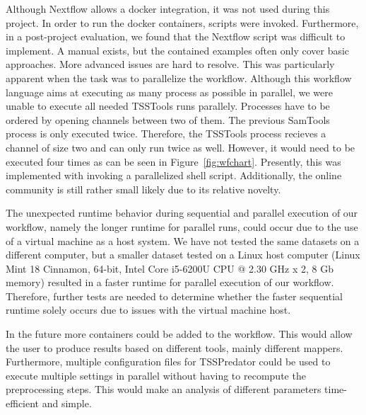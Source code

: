 \documentclass[twoside]{article}
\begin{document}
Although Nextflow allows a docker integration, it was not used during this project. In order to run the docker containers, scripts were invoked. Furthermore, in a post-project evaluation, we found that the Nextflow script was difficult to implement. A manual exists, but the contained examples often only cover basic approaches. More advanced issues are hard to resolve. This was particularly apparent when the task was to parallelize the workflow. Although this workflow language aims at executing as many process as possible in parallel, we were unable to execute all needed TSSTools runs parallely. Processes have to be ordered by opening channels between two of them. The previous SamTools process is only executed twice. Therefore, the TSSTools process recieves a channel of size two and can only run twice as well. However, it would need to be executed four times as can be seen in Figure~\ref{fig:wfchart}. Presently, this was implemented with invoking a parallelized shell script. Additionally, the online community is still rather small likely due to its relative  novelty.

The unexpected runtime behavior during sequential and parallel execution of our workflow, namely the longer runtime for parallel runs, could occur due to the use of a virtual machine as a host system. We have not tested the same datasets on a different computer, but a smaller dataset tested on a Linux host computer (Linux Mint 18 Cinnamon, 64-bit, Intel Core i5-6200U CPU @ 2.30 GHz x 2, 8 Gb memory) resulted in a faster runtime for parallel execution of our workflow. Therefore, further tests are needed to determine whether the faster sequential runtime solely occurs due to issues with the virtual machine host.

In the future more containers could be added to the workflow. This would allow the user to produce results based on different tools, mainly different mappers. Furthermore, multiple configuration files for TSSPredator could be used to execute multiple settings in parallel without having to recompute the preprocessing steps. This would make an analysis of different parameters time-efficient and simple.




\end{document}
